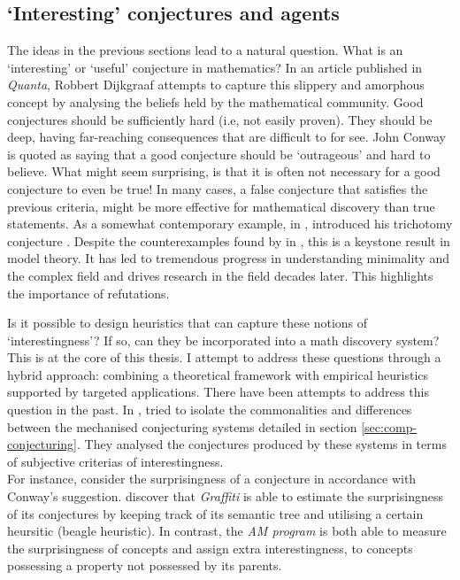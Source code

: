 \subsection{`Interesting' conjectures and agents}
\label{sec:intrst-conj-agents}
The ideas in the previous sections lead to a natural question. What is an `interesting' or `useful' conjecture in mathematics?
In an article published in \textit{Quanta}, Robbert Dijkgraaf attempts to capture this slippery and amorphous concept by analysing the beliefs held by the mathematical community. Good conjectures should be sufficiently hard (i.e, not easily proven). They should be deep, having far-reaching consequences that are difficult to for see. John Conway is quoted as saying that a good conjecture should be `outrageous' and hard to believe.
What might seem surprising, is that it is often not necessary for a good conjecture to even be true! In many cases, a false conjecture that satisfies the previous criteria, might be more effective for mathematical discovery than true statements. As a somewhat contemporary example, in \citeyear{trichotomy1984}, \citeauthor{trichotomy1984} introduced his trichotomy conjecture \cite{trichotomy1984}. Despite the counterexamples found by \citeauthor{hrushovskiNewStronglyMinimal1993} in \citeyear{hrushovskiNewStronglyMinimal1993} \cite{hrushovskiNewStronglyMinimal1993}, this is a keystone result in model theory. It has led to tremendous progress in understanding minimality and the complex field and drives research in the field decades later.
This highlights the importance of refutations.
\par Is it possible to design heuristics that can capture these notions of `interestingness'? If so, can they be incorporated into a math discovery system?
This is at the core of this thesis. I attempt to address these questions through a hybrid approach: combining a theoretical framework with empirical heuristics supported by targeted applications. There have been attempts to address this question in the past. In \cite{coltonNotionInterestingnessAutomated2000}, \citeauthor{coltonNotionInterestingnessAutomated2000} tried to isolate the commonalities and differences between the mechanised conjecturing systems detailed in section \ref{sec:comp-conjecturing}. They analysed the conjectures produced by these systems in terms of subjective criterias of interestingness.\\ For instance, consider the surprisingness of a conjecture in accordance with Conway's suggestion. 
\citeauthor{coltonNotionInterestingnessAutomated2000} discover that \textit{Graffiti} is able to estimate the surprisingness of its conjectures by keeping track of its semantic tree and utilising a certain heursitic (beagle heuristic). In contrast, the \textit{AM program} is both able to measure the surprisingness of concepts and assign extra interestingness, to concepts possessing a property not possessed by its parents.
